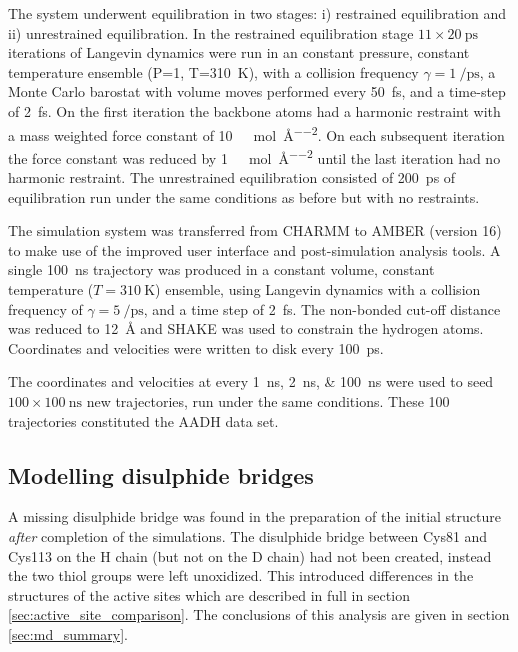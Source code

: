 The system underwent equilibration in two stages: i) restrained equilibration and ii) unrestrained equilibration. In the restrained equilibration stage $11 \times \SI{20}{\pico\second}$ iterations of Langevin dynamics were run in an constant pressure, constant temperature ensemble (P=\SI{1}{\atm}, T=\SI{310}{\kelvin}), with a collision frequency $\gamma=\SI{1}{\per\pico\second}$, a Monte Carlo barostat with volume moves performed every \SI{50}{\femto\second}, and a time-step of \SI{2}{\femto\second}. On the first iteration the backbone atoms had a harmonic restraint with a mass weighted force constant of  \SI{10}{\kilo\cal\per\mol\per\square\angstrom}. On each subsequent iteration the force constant was reduced by \SI{1}{\kilo\cal\per\mol\per\square\angstrom} until the last iteration had no harmonic restraint. The unrestrained equilibration consisted of \SI{200}{\pico\second} of equilibration run under the same conditions as before but with no restraints. 

The simulation system was transferred from CHARMM to AMBER (version 16) \cite{caseAMBER} to make use of the improved user interface and post-simulation analysis tools. A single  \SI{100}{\nano\second} trajectory was produced in a constant volume, constant temperature ($T=\SI{310}{\kelvin}$) ensemble, using Langevin dynamics with a collision frequency of $\gamma=\SI{5}{\per\pico\second}$, and a time step of \SI{2}{\femto\second}. The non-bonded cut-off distance was reduced to \SI{12}{\angstrom} and SHAKE \cite{ryckaertNumericalIntegrationCartesian1977b} was used to constrain the hydrogen atoms. Coordinates and velocities were written to disk every \SI{100}{\pico\second}.  

The coordinates and velocities at every \SIlist[list-final-separator = { ... }]{1; 2; 100}{\nano\second} were used to seed $100 \times \SI{100}{\nano\second}$ new trajectories, run under the same conditions. These \num{100} trajectories constituted the AADH data set. 

\subsection{Modelling disulphide bridges}
A missing disulphide bridge was found in the preparation of the initial structure \emph{after} completion of the simulations. The disulphide bridge between Cys81 and Cys113 on the H chain (but not on the D chain) had not been created, instead the two thiol groups were left unoxidized. This introduced differences in the structures of the active sites which are described in full in section \ref{sec:active_site_comparison}. The conclusions of this analysis are given in section \ref{sec:md_summary}.     


